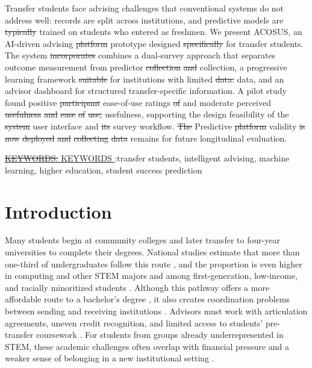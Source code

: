 \documentclass[letterpaper,11pt]{article}
\newcommand{\DIFdel}[1]{%
  \begingroup\setlength{\fboxsep}{0.5pt}%
  \colorbox{diffdelbg}{\textcolor{diffdeltext}{\sout{#1}}}%
  \endgroup}
\newcommand{\DIFadd}[1]{%
  \begingroup\setlength{\fboxsep}{0.5pt}%
  \colorbox{diffaddbg}{\textcolor{diffaddtext}{#1}}%
  \endgroup}
\begin{document}
Transfer students face advising challenges that conventional systems do not address well: records are split across institutions, and predictive models are \DIFdel{typically} trained on students who entered as freshmen. We present ACOSUS, an AI-driven advising \DIFdel{platform} \DIFadd{prototype} designed \DIFdel{specifically} for transfer students. The system \DIFdel{incorporates} \DIFadd{combines} a dual-survey approach that separates outcome measurement from predictor \DIFdel{collection} \DIFdel{and} \DIFadd{collection,} a progressive learning framework \DIFdel{suitable} for institutions with limited \DIFdel{data.} \DIFadd{data,} \DIFadd{and} \DIFadd{an} \DIFadd{advisor} \DIFadd{dashboard} \DIFadd{for} \DIFadd{structured} \DIFadd{transfer-specific} \DIFadd{information.} A pilot study found positive \DIFdel{participant} \DIFadd{ease-of-use} ratings \DIFdel{of} \DIFadd{and} \DIFadd{moderate} perceived \DIFdel{usefulness} \DIFdel{and} \DIFdel{ease} \DIFdel{of} \DIFdel{use,} \DIFadd{usefulness,} supporting the \DIFadd{design} feasibility of the \DIFdel{system} \DIFadd{user} \DIFadd{interface} and \DIFdel{its} survey workflow. \DIFdel{The} \DIFadd{Predictive} \DIFdel{platform} \DIFadd{validity} \DIFdel{is} \DIFdel{now} \DIFdel{deployed} \DIFdel{and} \DIFdel{collecting} \DIFdel{data} \DIFadd{remains} for future \DIFadd{longitudinal} evaluation.

\bigskip

\noindent \underline{\DIFdel{KEYWORDS:} \DIFadd{KEYWORDS}}:\quad transfer students, intelligent advising, machine learning, higher education, student success prediction

\section{Introduction}\label{sec:introduction}

Many students begin at community colleges and later transfer to four-year universities to complete their degrees. National studies estimate that more than one-third of undergraduates follow this route \parencite{monaghan2015}, and the proportion is even higher in computing and other STEM majors and among first-generation, low-income, and racially minoritized students \parencite{computingtransfer2024,wali2025transfer}. Although this pathway offers a more affordable route to a bachelor's degree \parencite{factoranalysis2023}, it also creates coordination problems between sending and receiving institutions \parencite{nguyen2025school}. Advisors must work with articulation agreements, uneven credit recognition, and limited access to students' pre-transfer coursework \parencite{nguyen2024community,roksa2008credits}. For students from groups already underrepresented in STEM, these academic challenges often overlap with financial pressure and a weaker sense of belonging in a new institutional setting \parencite{computingtransfer2024,nguyen2025school}.
\end{document}
